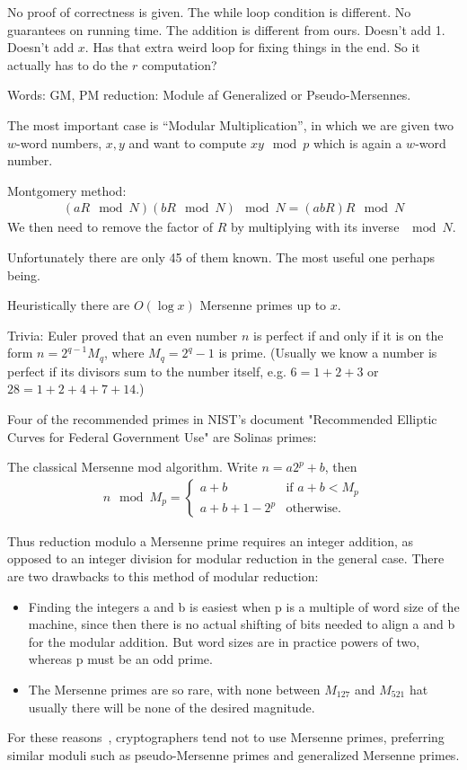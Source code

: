 No proof of correctness is given.
The while loop condition is different.
No guarantees on running time.
The addition is different from ours.
Doesn't add 1. Doesn't add $x$.
Has that extra weird loop for fixing things in the end.
So it actually has to do the $r$ computation?


Words:
 GM, PM reduction: Module af Generalized or Pseudo-Mersennes.

The most important case is ``Modular Multiplication'', in which we are given two $w$-word numbers, $x,y$ and want to compute $xy\mod p$ which is again a $w$-word number.

Montgomery method:
\begin{align}
   (aR\mod N)(bR\mod N) \mod N = (abR)R \mod N
\end{align}
We then need to remove the factor of $R$ by multiplying with its inverse $\mod N$.



Unfortunately there are only 45 of them known.
The most useful one perhaps being.

Heuristically there are $O(\log x)$ Mersenne primes up to $x$.


Trivia:
Euler proved that an even number $n$ is perfect if and only if it is on the form $n=2^{q-1}M_q$, where $M_q=2^q-1$ is prime.
(Usually we know a number is perfect if its divisors sum to the number itself, e.g. $6=1+2+3$ or $28=1+2+4+7+14$.)

Four of the recommended primes in NIST's document "Recommended Elliptic Curves for Federal Government Use" are Solinas primes:



The classical Mersenne mod algorithm.
Write $n = a2^p + b$, then
\begin{align}
   n \mod M_p = \begin{cases}
      a + b & \text{if } a+b<M_p\\
      a + b + 1 - 2^p & \text{otherwise}.
   \end{cases}
\end{align}

Thus reduction modulo a Mersenne prime requires an
integer addition, as opposed to an integer division for
modular reduction in the general case. There are two
drawbacks to this method of modular reduction:
\begin{itemize}
   \item Finding the integers a and b is easiest when p is a multiple of word size of the machine, since then there is
no actual shifting of bits needed to align a and b for
the modular addition. But word sizes are in practice
powers of two, whereas p must be an odd prime.
   \item The Mersenne primes are so rare, with none between
      $M_{127}$ and $M_{521}$ hat usually there will be none of the desired magnitude.
\end{itemize}
For these reasons~\cite{van2014encyclopedia}, cryptographers tend not to use Mersenne primes, preferring similar moduli such as pseudo-Mersenne primes and generalized Mersenne primes.

